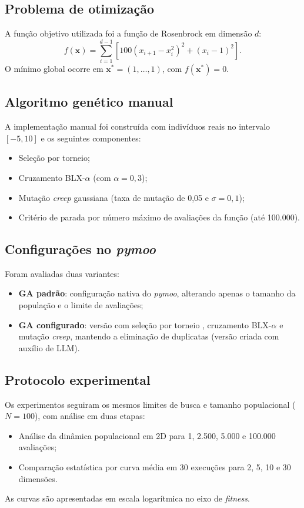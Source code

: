 \documentclass[runningheads]{llncs}
\begin{document}
\subsection{Problema de otimização}
A função objetivo utilizada foi a função de Rosenbrock em dimensão $d$:
\begin{equation}
    f(\mathbf{x}) = \sum_{i=1}^{d-1} \left[100(x_{i+1} - x_i^2)^2 + (x_i - 1)^2\right].
\end{equation}
O mínimo global ocorre em $\mathbf{x}^* = (1,\ldots,1)$, com $f(\mathbf{x}^*) = 0$.

\subsection{Algoritmo genético manual}
A implementação manual foi construída com indivíduos reais no intervalo $[-5,10]$ e os seguintes componentes:
\begin{itemize}
\item Seleção por torneio;
\item Cruzamento BLX-$\alpha$ (com $\alpha=0{,}3$);
\item Mutação \textit{creep} gaussiana (taxa de mutação de 0,05 e $\sigma=0{,}1$);
\item Critério de parada por número máximo de avaliações da função (até 100.000).
\end{itemize}

\subsection{Configurações no \textit{pymoo}}
Foram avaliadas duas variantes:
\begin{itemize}
\item \textbf{GA padrão}: configuração nativa do \textit{pymoo}, alterando apenas o tamanho da população e o limite de avaliações;
\item \textbf{GA configurado}: versão com seleção por torneio , cruzamento BLX-$\alpha$ e mutação \textit{creep}, mantendo a eliminação de duplicatas (versão criada com auxílio de LLM).
\end{itemize}

\subsection{Protocolo experimental}
Os experimentos seguiram os mesmos limites de busca e tamanho populacional ($N=100$), com análise em duas etapas:
\begin{itemize}
\item Análise da dinâmica populacional em 2D para 1, 2.500, 5.000 e 100.000 avaliações;
\item Comparação estatística por curva média em 30 execuções para 2, 5, 10 e 30 dimensões.
\end{itemize}
As curvas são apresentadas em escala logarítmica no eixo de \textit{fitness}.
\end{document}
